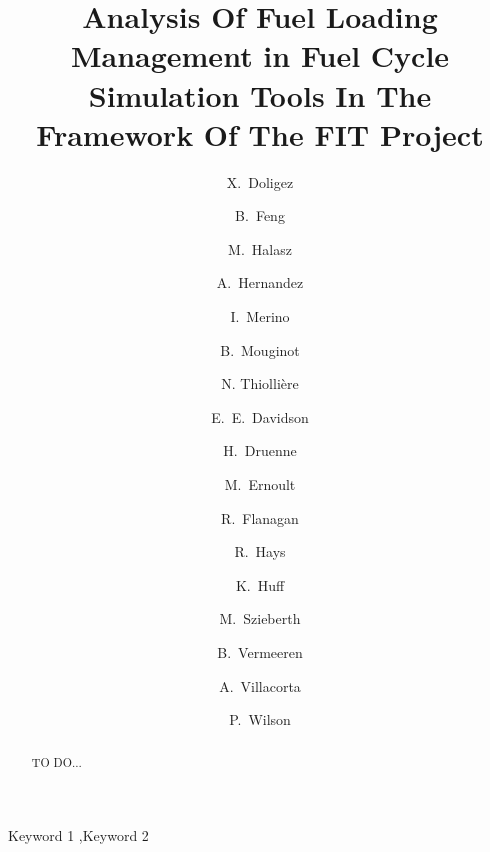 \documentclass[review]{elsarticle}
\begin{document}
\begin{frontmatter}

\title{Analysis Of Fuel Loading Management in Fuel Cycle Simulation Tools In The Framework Of The FIT Project}



\author[IPNO]{X.~Doligez}
\author[ANL]{B.~Feng}
\author[BUD]{M.~Halasz}
\author[SCK]{A.~Hernandez}
\author[MAULE]{I.~Merino}
\author[MAD]{B.~Mouginot}

\author[SUB]{N. Thiolli\`ere }

\author[ORNL]{E.~E.~Davidson}
\author[TRACT]{H.~Druenne}
\author[IPNO]{M.~Ernoult}
\author[USC]{R.~Flanagan}
\author[INL]{R.~Hays}
\author[UI]{K.~Huff}
\author[BUD]{M.~Szieberth}
\author[TRACT]{B.~Vermeeren}
\author[CIEMAT]{A.~Villacorta}
\author[MAD]{P.~Wilson}


\address[IPNO]{Institut de Physique Nucléaire d’Orsay, CNRS-IN2P3/Univ, Paris-Sud, France}
\address[MAD]{Univ. of Wisconsin Madison, Department of Nuclear Engineering and Engineering Physics, Madison, WI, United States}
\address[SUB]{Subatech, IMTA-IN2P3/CNRS-Universit\'e, Nantes, F-44307, France}
\address[MAULE]{Catholic University of the Maule, Av. San Miguel 3605, Talca, Chile}
\address[SCK]{SCK-CEN, Boeretang 200, 2400 Mol, Belgium}

\begin{abstract}
TO DO...
\end{abstract}

\begin{keyword}
Keyword 1 \sep Keyword 2
\end{keyword}

\end{frontmatter}

\linenumbers

\end{document}
